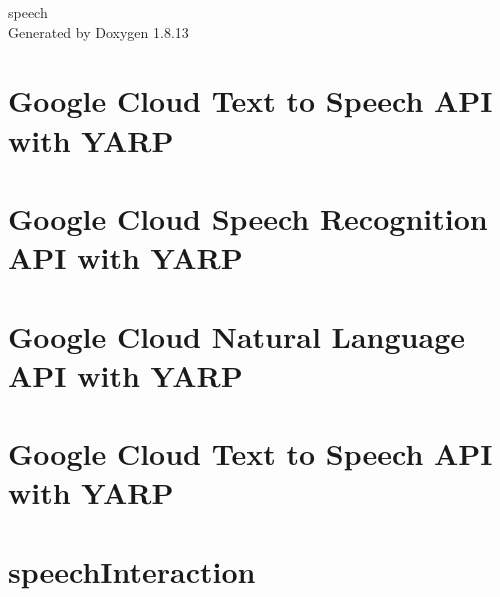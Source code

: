 \documentclass[twoside]{book}
\newcommand{\+}{\discretionary{\mbox{\scriptsize$\hookleftarrow$}}{}{}}
\newcommand{\clearemptydoublepage}{%
  \newpage{\pagestyle{empty}\cleardoublepage}%
}
\begin{document}
\begin{titlepage}
\vspace*{7cm}
\begin{center}%
{\Large speech }\\
\vspace*{1cm}
{\large Generated by Doxygen 1.8.13}\\
\end{center}
\end{titlepage}
\clearemptydoublepage
{}
\tableofcontents
\clearemptydoublepage
{}

\chapter{Google Cloud Text to Speech A\+PI with Y\+A\+RP}
\label{md__home_runner_work_speech_speech_gh-pages_speechInteraction_modules_googleDialog_README}

\chapter{Google Cloud Speech Recognition A\+PI with Y\+A\+RP}
\label{md__home_runner_work_speech_speech_gh-pages_speechInteraction_modules_googleSpeech_README}

\chapter{Google Cloud Natural Language A\+PI with Y\+A\+RP}
\label{md__home_runner_work_speech_speech_gh-pages_speechInteraction_modules_googleSpeechProcess_README}

\chapter{Google Cloud Text to Speech A\+PI with Y\+A\+RP}
\label{md__home_runner_work_speech_speech_gh-pages_speechInteraction_modules_googleSynthesis_README}

\chapter{speech\+Interaction}
\label{md__home_runner_work_speech_speech_gh-pages_speechInteraction_README}

\end{document}
